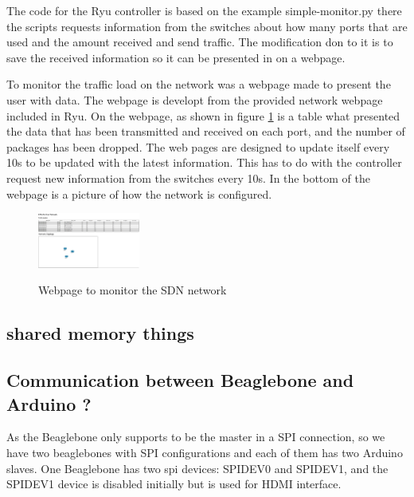 \documentclass[11pt, titlepage]{article} %
\begin{document}
The code for the Ryu controller is based on the example simple-monitor.py there the scripts requests information from the switches about how many ports that are used and the amount received and send traffic. The modification don to it is to save the received information so it can be presented in on a webpage.

To monitor the traffic load on the network was a webpage made to present the user with data. The webpage is developt from the provided network webpage included in Ryu. On the webpage, as shown in figure \ref{fig:webpage_sdn} is a table what presented the data that has been transmitted and received on each port, and the number of packages has been dropped. The web pages are designed to update itself every 10s to be updated with the latest information.  This has to do with the controller request new information from the switches every 10s.  In the bottom of the webpage is a picture of how the network is configured. 

\begin{figure}
	\includegraphics[width=0.3\textwidth]{webpage.PNG}
	\label{fig:webpage_sdn}
	\caption{Webpage to monitor the SDN network}
\end{figure}


\subsection{shared memory things}

\subsection{Communication between Beaglebone and Arduino ?}
As the Beaglebone only supports to be the master in a SPI connection, so we have two beaglebones with SPI configurations and each of them has two Arduino slaves. One Beaglebone has two spi devices: SPIDEV0 and SPIDEV1, and the SPIDEV1 device is disabled initially but is used for HDMI interface. 
\end{document}
